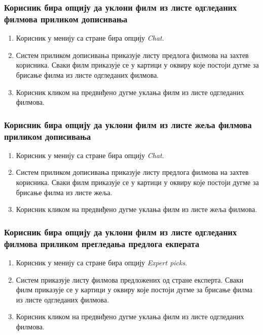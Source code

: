 \subsubsection{Корисник бира опцију да уклони филм из листе одгледаних филмова приликом дописивања}

\begin{enumerate}
    \item Корисник у менију са стране бира опцију \textit{Chat}.
    \item Систем приликом дописивања приказује листу предлога филмова на захтев корисника. Сваки филм 
    приказује се у картици у оквиру које постоји дугме за брисање филма из листе одгледаних филмова.
    \item Корисник кликом на предвиђено дугме уклања филм из листе одгледаних филмова.
\end{enumerate}

\subsubsection{Корисник бира опцију да уклони филм из листе жеља филмова приликом дописивања}

\begin{enumerate}
    \item Корисник у менију са стране бира опцију \textit{Chat}.
    \item Систем приликом дописивања приказује листу предлога филмова на захтев корисника. Сваки филм 
    приказује се у картици у оквиру које постоји дугме за брисање филма из листе жеља.
    \item Корисник кликом на предвиђено дугме уклања филм из листе жеља филмова.
\end{enumerate}

\subsubsection{Корисник бира опцију да уклони филм из листе одгледаних филмова приликом прегледања 
предлога екперата}

\begin{enumerate}
    \item Корисник у менију са стране бира опцију \textit{Expert picks}.
    \item Систем приказује листу филмова предложених од стране експерта. Сваки филм 
    приказује се у картици у оквиру које постоји дугме за брисање филма из листе одгледаних филмова.
    \item Корисник кликом на предвиђено дугме уклања филм из листе одгледаних филмова.
\end{enumerate}

